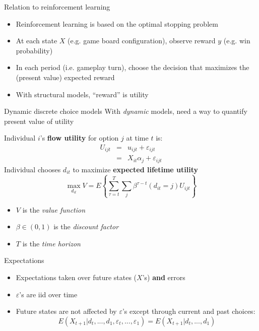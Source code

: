 \documentclass[english,aspectratio=169,12pt,xcolor=dvipsnames]{beamer}
\begin{document}
\begin{frame}{Relation to reinforcement learning}
\begin{itemize}
\item Reinforcement learning is based on the optimal stopping problem
\item At each state $X$ (e.g. game board configuration), observe reward $y$ (e.g. win probability)
\item In each period (i.e. gameplay turn), choose the decision that maximizes the (present value) expected reward
\item With structural models, ``reward'' is utility
\end{itemize}
\end{frame}



\begin{frame}{Dynamic discrete choice models}
With \emph{dynamic} models, need a way to quantify present value of utility

Individual $i$'s \textbf{flow utility} for option $j$ at time $t$ is:
\begin{eqnarray*}
    U_{ijt}&=&u_{ijt}+\varepsilon_{ijt}\\
           &=&X_{it}\alpha_j+\varepsilon_{ijt}
\end{eqnarray*}
Individual chooses $d_{it}$ to maximize \textbf{expected lifetime utility}
\begin{displaymath}
    \max_{d_{it}} V = E\left\{\sum_{\tau=t}^T\sum_j\beta^{\tau-t}(d_{it}=j)U_{ijt}\right\}
\end{displaymath} 
\begin{itemize}
    \item $V$ is the \emph{value function}
    \item $\beta\in\left(0,1\right)$ is the \emph{discount factor}
    \item $T$ is the \emph{time horizon}
\end{itemize}
\end{frame}




\begin{frame}{Expectations}
\begin{itemize}
\item Expectations taken over future states ($X$'s) \textbf{and} errors
\item $\varepsilon$'s are iid over time
\item Future states are not affected by $\varepsilon$'s except through current and past choices:
    \begin{displaymath}
        E\left(X_{t+1}|d_t,...,d_1,\varepsilon_t,...,\varepsilon_{1}\right)=E\left(X_{t+1}|d_t,...,d_1\right)
    \end{displaymath}
\end{itemize}
\end{frame}
\end{document}
